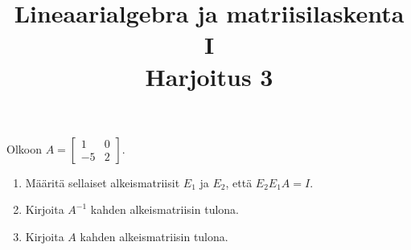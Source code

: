 \documentclass[11pt,a4paper]{amsart}
\title{Lineaarialgebra ja matriisilaskenta I\\Harjoitus 3}
\author{}
\date{}
\begin{document}

\begin{exercise}
  Olkoon \(A =
    \begin{bmatrix}
      1 & 0 \\
      -5 & 2
  \end{bmatrix}\).
  \begin{enumerate}[label=(\alph*), leftmargin=*]
    \item Määritä sellaiset alkeismatriisit \(E_1\) ja \(E_2\), että
      \(E_2E_1A = I\).
    \item Kirjoita \(A^{-1}\) kahden alkeismatriisin tulona.
    \item Kirjoita \(A\) kahden alkeismatriisin tulona.
  \end{enumerate}
\end{exercise}
\end{document}
